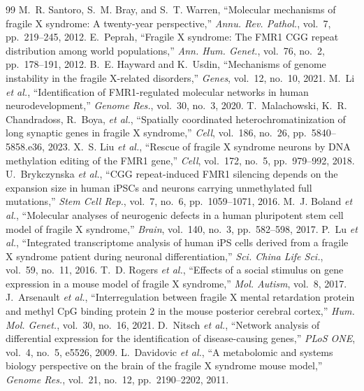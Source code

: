 \documentclass[journal]{IEEEtran}
\begin{document}
\begin{thebibliography}{99}
 M.~R. Santoro, S.~M. Bray, and S.~T. Warren, ``Molecular mechanisms of fragile X syndrome: A twenty-year perspective,'' \emph{Annu. Rev. Pathol.}, vol.~7, pp.~219--245, 2012.
 E.~Peprah, ``Fragile X syndrome: The FMR1 CGG repeat distribution among world populations,'' \emph{Ann. Hum. Genet.}, vol.~76, no.~2, pp.~178--191, 2012.
 B.~E. Hayward and K.~Usdin, ``Mechanisms of genome instability in the fragile X-related disorders,'' \emph{Genes}, vol.~12, no.~10, 2021.
 M.~Li \emph{et al.}, ``Identification of FMR1-regulated molecular networks in human neurodevelopment,'' \emph{Genome Res.}, vol.~30, no.~3, 2020.
 T.~Malachowski, K.~R. Chandradoss, R.~Boya, \emph{et al.}, ``Spatially coordinated heterochromatinization of long synaptic genes in fragile X syndrome,'' \emph{Cell}, vol.~186, no.~26, pp.~5840--5858.e36, 2023.
 X.~S. Liu \emph{et al.}, ``Rescue of fragile X syndrome neurons by DNA methylation editing of the FMR1 gene,'' \emph{Cell}, vol.~172, no.~5, pp.~979--992, 2018.
 U.~Brykczynska \emph{et al.}, ``CGG repeat-induced FMR1 silencing depends on the expansion size in human iPSCs and neurons carrying unmethylated full mutations,'' \emph{Stem Cell Rep.}, vol.~7, no.~6, pp.~1059--1071, 2016.
 M.~J. Boland \emph{et al.}, ``Molecular analyses of neurogenic defects in a human pluripotent stem cell model of fragile X syndrome,'' \emph{Brain}, vol.~140, no.~3, pp.~582--598, 2017.
 P.~Lu \emph{et al.}, ``Integrated transcriptome analysis of human iPS cells derived from a fragile X syndrome patient during neuronal differentiation,'' \emph{Sci. China Life Sci.}, vol.~59, no.~11, 2016.
 T.~D. Rogers \emph{et al.}, ``Effects of a social stimulus on gene expression in a mouse model of fragile X syndrome,'' \emph{Mol. Autism}, vol.~8, 2017.
 J.~Arsenault \emph{et al.}, ``Interregulation between fragile X mental retardation protein and methyl CpG binding protein 2 in the mouse posterior cerebral cortex,'' \emph{Hum. Mol. Genet.}, vol.~30, no.~16, 2021.
 D.~Nitsch \emph{et al.}, ``Network analysis of differential expression for the identification of disease-causing genes,'' \emph{PLoS ONE}, vol.~4, no.~5, e5526, 2009.
 L.~Davidovic \emph{et al.}, ``A metabolomic and systems biology perspective on the brain of the fragile X syndrome mouse model,'' \emph{Genome Res.}, vol.~21, no.~12, pp.~2190--2202, 2011.

\end{thebibliography}
\end{document}
